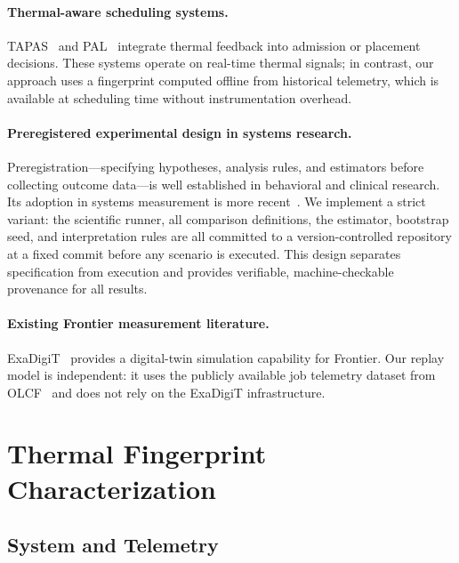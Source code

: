 \documentclass[acmsmall,screen,review,anonymous]{acmart}
\begin{document}
\paragraph{Thermal-aware scheduling systems.}
TAPAS~\cite{tapas} and PAL~\cite{pal} integrate thermal feedback into admission or
placement decisions.  These systems operate on real-time thermal signals; in contrast,
our approach uses a fingerprint computed offline from historical telemetry, which is
available at scheduling time without instrumentation overhead.

\paragraph{Preregistered experimental design in systems research.}
Preregistration---specifying hypotheses, analysis rules, and estimators before collecting
outcome data---is well established in behavioral and clinical research.  Its adoption in
systems measurement is more recent~\cite{mytkowicz2009producing}.  We implement a strict
variant: the scientific runner, all comparison definitions, the estimator, bootstrap seed,
and interpretation rules are all committed to a version-controlled repository at a fixed
commit before any scenario is executed.  This design separates specification from
execution and provides verifiable, machine-checkable provenance for all results.

\paragraph{Existing Frontier measurement literature.}
ExaDigiT~\cite{exadigit} provides a digital-twin simulation capability for Frontier.
Our replay model is independent: it uses the publicly available job telemetry dataset
from OLCF~\cite{frontier_olcf_dataset} and does not rely on the ExaDigiT infrastructure.

\section{Thermal Fingerprint Characterization}
\label{sec:fingerprint}

\subsection{System and Telemetry}
\end{document}
